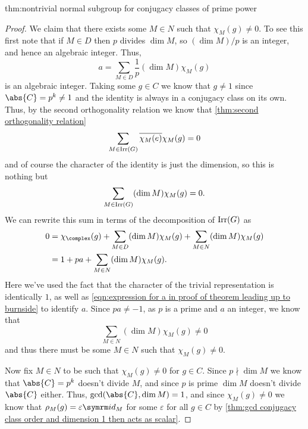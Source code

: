 \begin{thm}{}{thm:nontrivial normal subgroup for conjugacy classes of prime power}
\begin{proof}
        We claim that there exists some \(M \in N\) such that \(\chi_M(g) \ne 0\).
        To see this first note that if \(M \in D\) then \(p\) divides \(\dim M\), so \((\dim M)/p\) is an integer, and hence an algebraic integer.
        Thus,
        \begin{equation}
            \label{eqn:expression for a in proof of theorem leading up to burnside}
            a = \sum_{M \in D} \frac{1}{p} (\dim M) \chi_M(g)
        \end{equation}
        is an algebraic integer.
        Taking some \(g \in C\) we know that \(g \ne 1\) since \(\abs{C} = p^k \ne 1\) and the identity is always in a conjugacy class on its own.
        Thus, by the second orthogonality relation we know that \cref{thm:second orthogonality relation}
        \begin{equation}
            \sum_{M \in \operatorname{Irr} (G)} \overline{\chi_M(e)} \chi_M(g) = 0
        \end{equation}
        and of course the character of the identity is just the dimension, so this is nothing but
        \begin{equation}
            \sum_{M \in \operatorname{Irr}(G)} (\dim M) \chi_M(g) = 0.
        \end{equation}
        We can rewrite this sum in terms of the decomposition of \(\operatorname{Irr}(G)\) as
        \begin{align}
            0 &= \chi_{\complex}(g) + \sum_{M \in D} (\dim M) \chi_M(g) + \sum_{M \in N} (\dim M) \chi_M(g)\\
            &= 1 + p a + \sum_{M \in N} (\dim M) \chi_M(g).
        \end{align}
        Here we've used the fact that the character of the trivial representation is identically \(1\), as well as \cref{eqn:expression for a in proof of theorem leading up to burnside} to identify \(a\).
        Since \(pa \ne -1\), as \(p\) is a prime and \(a\) an integer, we know that
        \begin{equation}
            \sum_{M \in N} (\dim M)\chi_M(g) \ne 0
        \end{equation}
        and thus there must be some \(M \in N\) such that \(\chi_M(g) \ne 0\).
        
        Now fix \(M \in N\) to be such that \(\chi_M(g) \ne 0\) for \(g \in C\).
        Since \(p \nmid \dim M\) we know that \(\abs{C} = p^k\) doesn't divide \(M\), and since \(p\) is prime \(\dim M\) doesn't divide \(\abs{C}\) either.
        Thus, \(\gcd(\abs{C}, \dim M) = 1\), and since \(\chi_M(g) \ne 0\) we know that \(\rho_M(g) = \varepsilon \id_M\) for some \(\varepsilon\) for all \(g \in C\) by \cref{thm:gcd conjugacy class order and dimension 1 then acts as scalar}.
        

\end{proof}
\end{thm}
